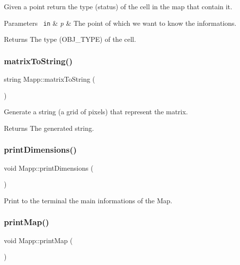 Given a point return the type (status) of the cell in the map that contain it. 


\begin{DoxyParams}[1]{Parameters}
\mbox{\texttt{ in}}  & {\em p} & The point of which we want to know the informations. \\
\hline
\end{DoxyParams}
\begin{DoxyReturn}{Returns}
The type (O\+B\+J\+\_\+\+T\+Y\+PE) of the cell. 
\end{DoxyReturn}
\mbox{\label{class_mapp_ad38f31eac2ad66836325c152db1f88c3}} 
\subsubsection{\texorpdfstring{matrixToString()}{matrixToString()}}
{\footnotesize\ttfamily string Mapp\+::matrix\+To\+String (\begin{DoxyParamCaption}{ }\end{DoxyParamCaption})}



Generate a string (a grid of pixels) that represent the matrix. 

\begin{DoxyReturn}{Returns}
The generated string. 
\end{DoxyReturn}
\mbox{\label{class_mapp_a0405773fd644d183c603b569e9957248}} 
\subsubsection{\texorpdfstring{printDimensions()}{printDimensions()}}
{\footnotesize\ttfamily void Mapp\+::print\+Dimensions (\begin{DoxyParamCaption}{ }\end{DoxyParamCaption})}



Print to the terminal the main informations of the Map. 

\mbox{\label{class_mapp_ab795b79c5d655f6a62303c4a415ee73c}} 
\subsubsection{\texorpdfstring{printMap()}{printMap()}}
{\footnotesize\ttfamily void Mapp\+::print\+Map (\begin{DoxyParamCaption}{ }\end{DoxyParamCaption})}



